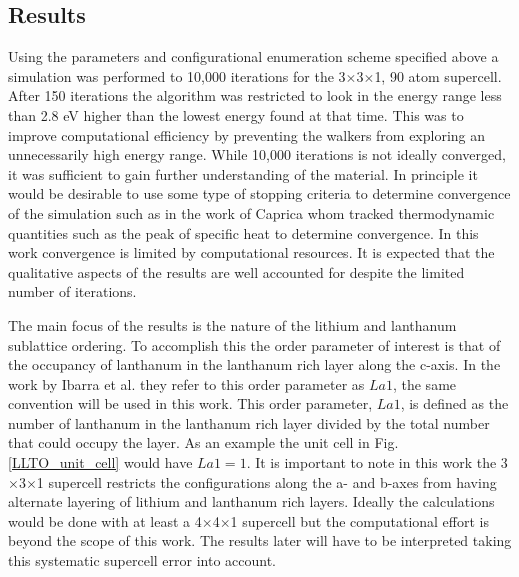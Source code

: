\documentclass[aps,pre,reprint,superscriptaddress,showkeys]{revtex4-2}
\begin{document}
\subsection{Results}
  Using the parameters and configurational enumeration scheme specified above a simulation was performed to 10,000 iterations for  the 3$\times$3$\times$1,  90 atom supercell. After 150 iterations the algorithm was restricted to look  in the energy range less than 2.8 eV higher than the lowest energy found at that time. This was to improve computational efficiency by preventing the walkers from exploring an unnecessarily high energy range. While 10,000 iterations is not ideally converged, it was sufficient to gain further understanding of the material. In principle it would be desirable to use some type of stopping criteria to determine convergence of the simulation such as in the work of Caprica\cite{halting_wang_and_landau} whom tracked thermodynamic quantities such as the peak of specific heat to determine convergence. In this work convergence is limited by computational resources.   
It is expected that the qualitative aspects of the results are well accounted for despite the limited number of iterations. 
  
The main focus of the results is the nature of the lithium and lanthanum sublattice ordering. To accomplish this the order parameter of interest is that of the occupancy of lanthanum in the lanthanum rich layer along the c-axis.  In the work by Ibarra et al. \cite{P4mmmstrucuture} they refer to this order parameter as $La1$, the same convention will be used in this work. This order parameter, $La1$, is defined as the number of lanthanum in the lanthanum rich layer divided by the total number that could occupy the layer. As an example the unit cell in Fig. \ref{LLTO_unit_cell} would have $La1=1$. It is important to note in this work the 3$\times$3$\times$1 supercell restricts the configurations along the a- and b-axes from having alternate layering of lithium and lanthanum rich layers. Ideally the calculations would be done with at least a 4$\times$4$\times$1 supercell but the computational effort is beyond the scope of this work. The results later will have to be interpreted taking this systematic supercell error into account.  
  
\end{document}
